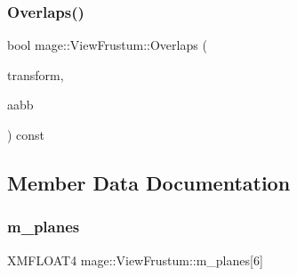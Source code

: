 \hypertarget{classmage_1_1_view_frustum_a302c7b49592bc9e5a297270da0c8b6ec}{}\label{classmage_1_1_view_frustum_a302c7b49592bc9e5a297270da0c8b6ec} 
\subsubsection{\texorpdfstring{Overlaps()}{Overlaps()}\hspace{0.1cm}{\footnotesize\ttfamily [2/2]}}
{\footnotesize\ttfamily bool mage\+::\+View\+Frustum\+::\+Overlaps (\begin{DoxyParamCaption}\item[{const \hyperlink{structmage_1_1_transform}{Transform} \&}]{transform,  }\item[{const \hyperlink{structmage_1_1_a_a_b_b}{A\+A\+BB} \&}]{aabb }\end{DoxyParamCaption}) const}



\subsection{Member Data Documentation}
\hypertarget{classmage_1_1_view_frustum_aa5d8b90bfc005bd19566983401ccd511}{}\label{classmage_1_1_view_frustum_aa5d8b90bfc005bd19566983401ccd511} 
\subsubsection{\texorpdfstring{m\+\_\+planes}{m\_planes}}
{\footnotesize\ttfamily X\+M\+F\+L\+O\+A\+T4 mage\+::\+View\+Frustum\+::m\+\_\+planes\mbox{[}6\mbox{]}\hspace{0.3cm}{\ttfamily [private]}}

